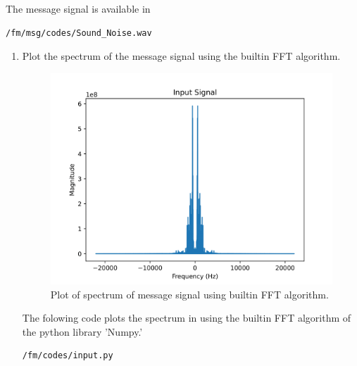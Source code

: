 The message signal is available in 
\begin{lstlisting}
/fm/msg/codes/Sound_Noise.wav
\end{lstlisting}
\begin{enumerate}[label=\arabic*.,ref=\thesection.\theenumi]
\item Plot the spectrum of the message signal using the builtin FFT algorithm.\\
	\solution		
\begin{figure}[H]
\centering
\includegraphics[width=\columnwidth]{fm/msg/figs/FFTbuiltin/inputs-1.png}
\caption{Plot of spectrum of message signal using builtin FFT algorithm.}
\label{fig:FFTb}
\end{figure}
The folowing code plots the spectrum in  using the builtin FFT algorithm of the python library 'Numpy.'
\begin{lstlisting}
/fm/codes/input.py
\end{lstlisting}


\end{enumerate}
